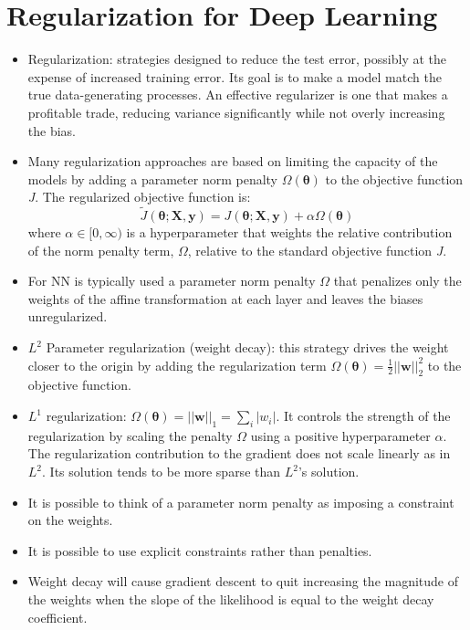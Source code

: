 \documentclass{article}
\begin{document}
\section{Regularization for Deep Learning}
\begin{itemize}
\item Regularization: strategies designed to reduce the test error, possibly at the expense of increased training error. Its goal is to make a model match the true data-generating processes. An effective regularizer is one that makes a profitable trade, reducing variance significantly while not overly increasing the bias.
\item Many regularization approaches are based on limiting the capacity of the models by adding a parameter norm penalty \(\Omega (\boldsymbol{\theta})\) to the objective function \textit{J}. The regularized objective function is:
\[
	\tilde{J}(\boldsymbol{\theta}; \boldsymbol{X}, \boldsymbol{y}) = J(\boldsymbol{\theta}; \boldsymbol{X}, \boldsymbol{y}) + \alpha \Omega (\boldsymbol{\theta})
\]
where \(\alpha \in [0, \infty)\) is a hyperparameter that weights the relative contribution of the norm penalty term, \(\Omega\), relative to the standard objective function \textit{J}.
\item For NN is typically used a parameter norm penalty \(\Omega\) that penalizes only the weights of the affine transformation at each layer and leaves the biases unregularized.
\item \(L^2\) Parameter regularization (weight decay): this strategy drives the weight closer to the origin by adding the regularization term \(\Omega(\boldsymbol{\theta}) = \frac{1}{2}||\boldsymbol{w}||^2_2\) to the objective function.
\item \(L^1\) regularization: \(\Omega(\boldsymbol{\theta}) = ||\boldsymbol{w}||_1 = \sum_i{|w_i|}\). It controls the strength of the regularization by scaling the penalty \(\Omega\) using a positive hyperparameter \(\alpha\). The regularization contribution to the gradient does not scale linearly as in \(L^2\). Its solution tends to be more sparse than \(L^2\)'s solution.
\item It is possible to think of a parameter norm penalty as imposing a constraint on the weights.
\item It is possible to use explicit constraints rather than penalties.
\item Weight decay will cause gradient descent to quit increasing the magnitude of the weights when the slope of the likelihood is equal to the weight decay coefficient.

\end{itemize}
\end{document}
